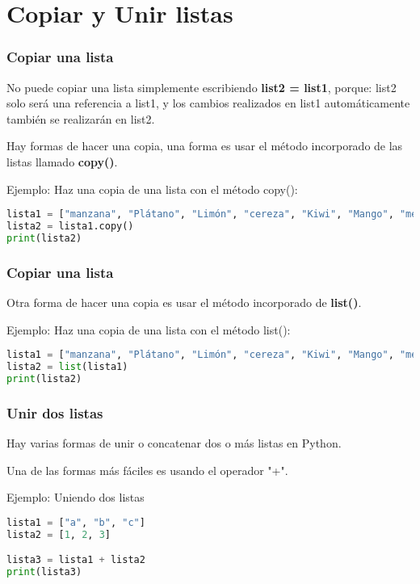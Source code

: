 \section{Copiar y Unir listas}


\begin{frame}[fragile]
  \frametitle{Copiar una lista}

  No puede copiar una lista simplemente escribiendo \textbf{list2 = list1},
  porque: list2 solo será una referencia a list1, y los cambios realizados
  en list1 automáticamente también se realizarán en list2.

  \vspace{\baselineskip}
  Hay formas de hacer una copia, una forma es usar el método incorporado de
  las listas llamado \textbf{copy()}.

  \vspace{\baselineskip}
  Ejemplo: Haz una copia de una lista con el método copy():
  \begin{lstlisting}[language=Python]
lista1 = ["manzana", "Plátano", "Limón", "cereza", "Kiwi", "Mango", "melón"]
lista2 = lista1.copy()
print(lista2)
  \end{lstlisting}
\end{frame}

\begin{frame}[fragile]
  \frametitle{Copiar una lista}

  Otra forma de hacer una copia es usar el método incorporado de
  \textbf{list()}.

  \vspace{\baselineskip}
  Ejemplo: Haz una copia de una lista con el método list():
  \begin{lstlisting}[language=Python]
lista1 = ["manzana", "Plátano", "Limón", "cereza", "Kiwi", "Mango", "melón"]
lista2 = list(lista1)
print(lista2)
  \end{lstlisting}
\end{frame}

\begin{frame}[fragile]
  \frametitle{Unir dos listas}

  Hay varias formas de unir o concatenar dos o más listas en Python.

  Una de las formas más fáciles es usando el operador "+".

  \vspace{\baselineskip}
  Ejemplo: Uniendo dos listas
  \begin{lstlisting}[language=Python]
lista1 = ["a", "b", "c"]
lista2 = [1, 2, 3]

lista3 = lista1 + lista2
print(lista3)
  \end{lstlisting}
\end{frame}

